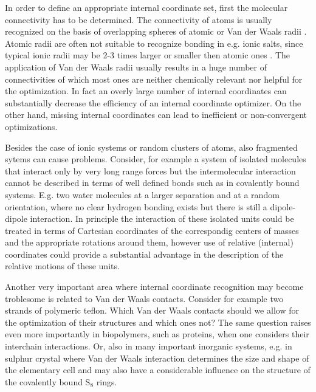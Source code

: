 \documentclass[prl,aps,preprint,superbib,12pt]{revtex4}
\begin{document}
In order to define an appropriate internal coordinate set, first
the molecular connectivity has to be determined.
The connectivity of atoms is usually recognized on the basis of 
overlapping spheres of atomic or Van der Waals radii 
\cite{VBakken02,TBucko05,KNemeth04}. Atomic radii are often not suitable
to recognize bonding in e.g. ionic salts, since typical ionic radii
may be 2-3 times larger or smaller then atomic ones 
\cite{Slater_64v41}. The application
of Van der Waals radii usually results in a huge number of 
connectivities of which most ones are neither chemically relevant nor 
helpful for the optimization. In fact an overly large number
of internal coordinates can substantially decrease the efficiency of
an internal coordinate optimizer. On the other hand, missing internal 
coordinates can lead to inefficient or non-convergent optimizations.

Besides the case of ionic systems or random clusters of atoms,
also fragmented sytems can cause problems. Consider, for example
a system of isolated molecules that interact only by very long range
forces but the intermolecular interaction cannot be described
in terms of well defined bonds such as in covalently bound systems.
E.g. two water molecules at a larger separation and at a random 
orientation, where no clear hydrogen bonding exists but there is still
a dipole-dipole interaction.
In principle the interaction of these isolated units could be treated
in terms of Cartesian coordinates of the correspondig centers 
of masses
and the appropriate rotations around them, however use of 
relative (internal) coordinates could provide a substantial advantage
in the description of the relative motions of these units.

Another very important area where internal coordinate recognition
may become troblesome is related to Van der Waals contacts.
Consider for example two strands of polymeric teflon. Which 
Van der Waals contacts should we allow for the optimization of their
structures and which ones not? The same question raises even more
importantly in biopolymers, such as proteins, when one considers
their interchain interactions. Or, also in many important
inorganic systems, e.g. in sulphur crystal where Van der Waals 
interaction determines the size and shape of the elementary cell and
may also have a considerable influence on the structure of the
covalently bound S$_{8}$ rings.
\end{document}
